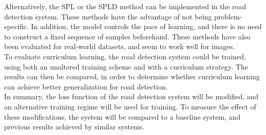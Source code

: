 Alternatively, the \ac{SPL} or the \ac{SPLD} method \citep{Kumar_self_paced_learning} \citep{Lu_self-paced_learning_diversity} can be implemented in the road detection system. These methods have the advantage of not being problem-specific. In addition, the model controls the pace of learning, and there is no need to construct a fixed sequence of samples beforehand. These methods have also been evaluated for real-world datasets, and seem to work well for images. \\ 

To evaluate curriculum learning, the road detection system could be trained, using both an unaltered training scheme and with a curriculum strategy. The results can then be compared, in order to determine whether curriculum learning can achieve better generalization for road detection.\\


In summary, the loss function of the road detection system will be modified, and an alternative training regime will be used for training. To measure the effect of these modifications, the system will be compared to a baseline system, and previous results achieved by similar systems.